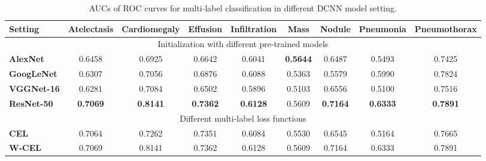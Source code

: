 \documentclass[10pt,twocolumn,letterpaper]{article}
\begin{document}
\begin{table}[t]
	\small
	\centering
	\begin{tabular}{|p{6.5em}||c|c|c|c|c|c|c|c|}
		\hline  
		{\bf Setting}   & {\bf Atelectasis} & {\bf Cardiomegaly} & {\bf Effusion} & {\bf Infiltration} & {\bf Mass} & {\bf Nodule} & {\bf Pneumonia} & {\bf Pneumothorax} \\
		\hline\hline
		\multicolumn{9}{|c|}{Initialization with different pre-trained models}\\
		\hline
		{\bf AlexNet}   &0.6458&0.6925&0.6642&0.6041&\textbf{0.5644}&0.6487&0.5493&0.7425 \\
		\hline
		{\bf GoogLeNet}    & 0.6307&0.7056&0.6876&0.6088&0.5363&0.5579&0.5990&0.7824\\
		\hline
		{\bf VGGNet-16}   & 0.6281&0.7084&0.6502&0.5896&0.5103&0.6556&0.5100&0.7516 \\
		\hline
		{\bf ResNet-50}   & \textbf{0.7069}&\textbf{0.8141}&\textbf{0.7362}&\textbf{0.6128}&0.5609&\textbf{0.7164}&\textbf{0.6333}&\textbf{0.7891}\\
		\hline
		\multicolumn{9}{|c|}{Different multi-label loss functions}\\
		\hline
		{\bf CEL}   &0.7064&0.7262&0.7351&0.6084&0.5530&0.6545&0.5164&0.7665\\
		\hline
		{\bf W-CEL}   & 0.7069&0.8141&0.7362&0.6128&0.5609&0.7164&0.6333&0.7891\\
		\hline
	\end{tabular}\label{tab:AUC_all}
	\caption{AUCs of ROC curves for multi-label classification in different DCNN model setting.}
\end{table}
\end{document}
